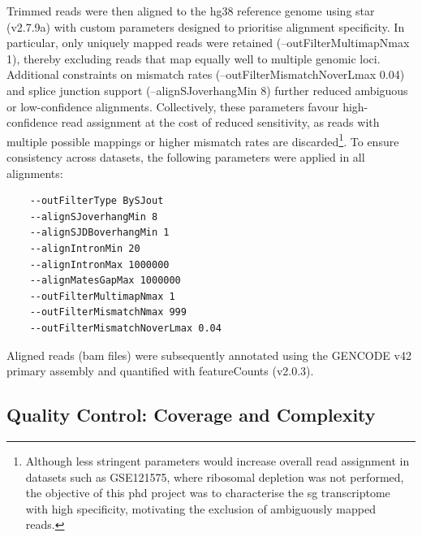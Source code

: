 Trimmed reads were then aligned to the \gls{hg38} reference genome using \gls{star} (v2.7.9a)\cite{dobin_star_2013} with custom parameters designed to prioritise alignment specificity. In particular, only uniquely mapped reads were retained (--outFilterMultimapNmax 1), thereby excluding reads that map equally well to multiple genomic loci. Additional constraints on mismatch rates (--outFilterMismatchNoverLmax 0.04) and splice junction support (--alignSJoverhangMin 8) further reduced ambiguous or low-confidence alignments. Collectively, these parameters favour high-confidence read assignment at the cost of reduced sensitivity, as reads with multiple possible mappings or higher mismatch rates are discarded\footnote{Although less stringent parameters would increase overall read assignment in datasets such as GSE121575\cite{padron_proximity_2019}, where ribosomal depletion was not performed, the objective of this \gls{phd} project was to characterise the \gls{sg} transcriptome with high specificity, motivating the exclusion of ambiguously mapped reads.}. To ensure consistency across datasets, the following parameters were applied in all alignments:

\begin{lstlisting}
	--outFilterType BySJout
	--alignSJoverhangMin 8
	--alignSJDBoverhangMin 1
	--alignIntronMin 20
	--alignIntronMax 1000000
	--alignMatesGapMax 1000000
	--outFilterMultimapNmax 1
	--outFilterMismatchNmax 999
	--outFilterMismatchNoverLmax 0.04
\end{lstlisting}

\noindent
Aligned reads (\gls{bam} files) were subsequently annotated using the GENCODE v42 primary assembly\cite{frankish_gencode_2021} and quantified with featureCounts (v2.0.3)\cite{liao_featurecounts_2014}.

\subsection{Quality Control: Coverage and Complexity}


